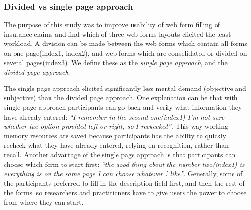 \documentclass[../main/Replicate.tex]{subfiles}
\begin{document}
%	
	
	\subsubsection{Divided vs single page approach}
	The purpose of this study was to improve usability of web form filling of insurance claims and find which of three web forms layouts elicited the least workload. A division can be made between the web forms which contain all forms on one page(index1, index2), and web forms which are consolidated or divided on several pages(index3). We define these as the \textit{single page approach}, and the \textit{divided page approach}.
	
	The single page approach elicited significantly less mental demand (objective and subjective) than the divided page approach. One explanation can be that with single page approach participants can go back and verify what information they have already entered: \textit{``I remember in the second one(index1) I'm not sure whether the option provided left or right, so I rechecked''}. This way working memory resources are saved because participants has the ability to quickly recheck what they have already entered, relying on recognition, rather than recall\cite{nielsen1990heuristic}. Another advantage of the single page approach is that participants can choose which form to start first: \textit{``the good thing about the number two(index1) is everything is on the same page I can choose whatever I like''}. Generally, some of the participants preferred to fill in the description field first, and then the rest of the forms, so researchers and practitioners have to give users the power to choose from where they can start. 
	
\end{document}
